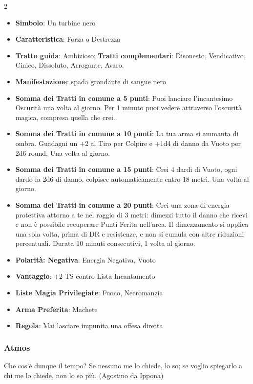 \begin{multicols}{2}
\begin{itemize}[leftmargin=*] \setlength{\itemsep}{0pt}
\item \textbf{Simbolo}: Un turbine nero
\item \textbf{Caratteristica}: Forza o Destrezza
\item \textbf{Tratto guida}: Ambizioso; \textbf{Tratti complementari}: Disonesto, Vendicativo, Cinico, Dissoluto, Arrogante, Avaro.
\item \textbf{Manifestazione}: spada grondante di sangue nero
\item \textbf{Somma dei Tratti in comune a 5 punti}: Puoi lanciare l'incantesimo Oscurità una volta al giorno. Per 1 minuto puoi vedere attraverso l'oscurità magica, compresa quella che crei.
\item \textbf{Somma dei Tratti in comune a 10 punti}: La tua arma si ammanta di ombra. Guadagni un +2 al Tiro per Colpire e +1d4 di danno da Vuoto per 2d6 round, Una volta al giorno.
\item \textbf{Somma dei Tratti in comune a 15 punti}: Crei 4 dardi di Vuoto, ogni dardo fa 2d6 di danno, colpisce automaticamente entro 18 metri. Una volta al giorno.
\item \textbf{Somma dei Tratti in comune a 20 punti}: Crei una zona di energia protettiva attorno a te nel raggio di 3 metri: dimezzi tutto il danno che ricevi e non è possibile recuperare Punti Ferita nell'area. Il dimezzamento si applica una sola volta, prima di DR e resistenze, e non si cumula con altre riduzioni percentuali. Durata 10 minuti consecutivi, 1 volta al giorno.
\item \textbf{Polarità: Negativa}: Energia Negativa, Vuoto
\item \textbf{Vantaggio}: +2 TS contro Lista Incantamento
\item \textbf{Liste Magia Privilegiate}: Fuoco, Necromanzia
\item \textbf{Arma Preferita}: Machete
\item \textbf{Regola}: Mai lasciare impunita una offesa diretta
\end{itemize}

\subsubsection{Atmos}\label{atmos}\hypertarget{atmos}{}

\begin{enfasi}{
Che cos'è dunque il tempo? Se nessuno me lo chiede, lo so; se voglio spiegarlo a chi me lo chiede, non lo so più. (Agostino da Ippona)
}\end{enfasi}


\end{multicols}
